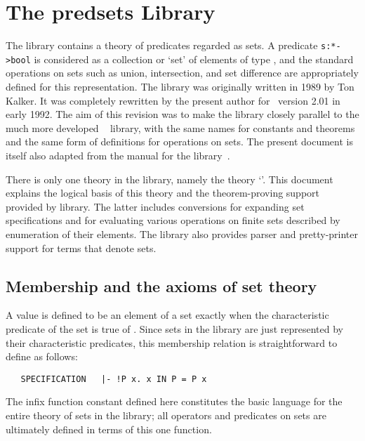 \chapter{The pred{\und}sets Library}

The  library contains a theory of predicates regarded as sets.
A predicate {\small\verb!s:*->bool!} is considered as a collection or `set' of
elements of type \ml{*}, and the standard operations on sets such as union,
intersection, and set difference are appropriately defined for this
representation.  The library was originally written in 1989 by Ton Kalker.  It
was completely rewritten by the present author for \HOL\ version 2.01 in early
1992.  The aim of this revision was to make the  library closely
parallel to the much more developed \HOL\  library, with the same
names for constants and theorems and the same form of definitions for
operations on sets.  The present document is itself also adapted from the
manual for the  library~\cite{melham}.

There is only one theory in the  library, namely the theory
`'. This document explains the logical basis of this theory and
the theorem-proving support provided by library.  The latter includes
conversions for expanding set specifications and for evaluating various
operations on finite sets described by enumeration of their elements.  The
library also provides parser and pretty-printer support for terms that denote
sets.

\section{Membership and the axioms of set theory}

A value  is defined to be an element of a set exactly when the
characteristic predicate of the set is true of . Since sets in the
 library are just represented by their characteristic
predicates, this membership relation is straightforward to define as follows:

\begin{hol}
\begin{verbatim}
   SPECIFICATION   |- !P x. x IN P = P x
\end{verbatim}\end{hol}

\noindent The infix function constant  defined here constitutes the
basic language for the entire theory of sets in the  library;
all operators and predicates on sets are ultimately defined in terms of this
one function.

